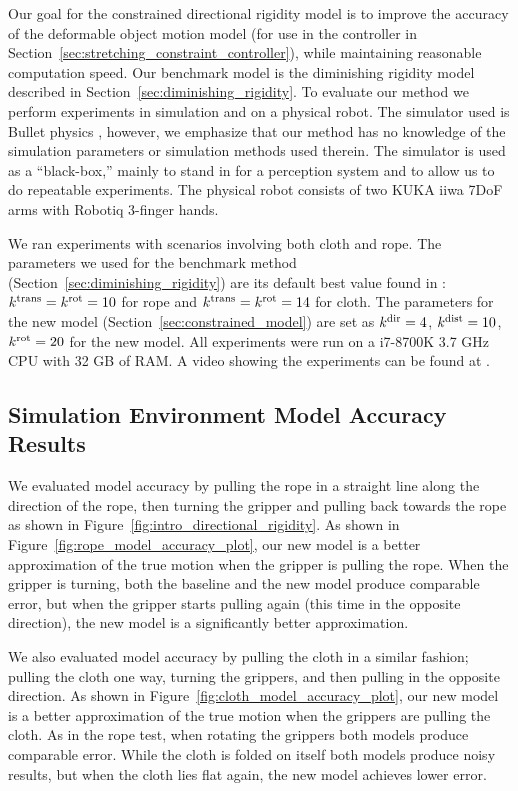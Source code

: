 Our goal for the constrained directional rigidity model is to improve the accuracy of the deformable object motion model (for use in the controller in Section~\ref{sec:stretching_constraint_controller}), while maintaining reasonable computation speed. Our benchmark model is the diminishing rigidity model described in Section~\ref{sec:diminishing_rigidity}. To evaluate our method we perform experiments in simulation and on a physical robot. The simulator used is Bullet physics \cite{Coumans2010}, however, we emphasize that our method has no knowledge of the simulation parameters or simulation methods used therein. The simulator is used as a ``black-box,'' mainly to stand in for a perception system and to allow us to do repeatable experiments. The physical robot consists of two KUKA iiwa 7DoF arms with Robotiq 3-finger hands.

We ran experiments with scenarios involving both cloth and rope.  The parameters we used for the benchmark method (Section~\ref{sec:diminishing_rigidity}) are its default best value found in \cite{Berenson2013}: $k^{\textrm{trans}} = k^{\textrm{rot}} = 10$ for rope and $k^{\textrm{trans}} = k^{\textrm{rot}} = 14$ for cloth. The parameters for the new model (Section~\ref{sec:constrained_model}) are set as $k^\textrm{dir} = 4$, $k^\textrm{dist} = 10$, $k^{\textrm{rot}} = 20$ for the new model. All experiments were run on a i7-8700K 3.7 GHz CPU with 32 GB of RAM. A video showing the experiments can be found at \irosurl.

\subsection{Simulation Environment Model Accuracy Results}

We evaluated model accuracy by pulling the rope in a straight line along the direction of the rope, then turning the gripper and pulling back towards the rope as shown in Figure~\ref{fig:intro_directional_rigidity}. As shown in Figure~\ref{fig:rope_model_accuracy_plot}, our new model is a better approximation of the true motion when the gripper is pulling the rope. When the gripper is turning, both the baseline and the new model produce comparable error, but when the gripper starts pulling again (this time in the opposite direction), the new model is a significantly better approximation.

We also evaluated model accuracy by pulling the cloth in a similar fashion; pulling the cloth one way, turning the grippers, and then pulling in the opposite direction. As shown in Figure~\ref{fig:cloth_model_accuracy_plot}, our new model is a better approximation of the true motion when the grippers are pulling the cloth. As in the rope test, when rotating the grippers both models produce comparable error. While the cloth is folded on itself both models produce noisy results, but when the cloth lies flat again, the new model achieves lower error.

